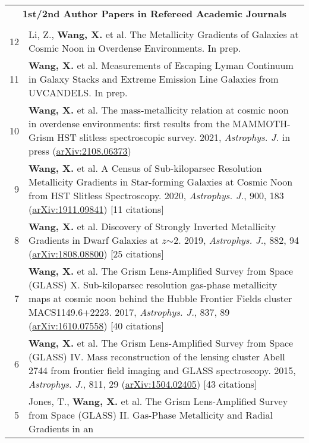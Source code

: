 \documentclass[letterpaper,12pt]{article}
\newcommand{\narrow}{-1.6ex}
\begin{document}
\vspace*{-.3in}

\begingroup
\renewcommand\arraystretch{1.2}
\begin{longtable}{rp{5.8in}}
\multicolumn{2}{c}{\textbf{1st/2nd Author Papers in Refereed Academic Journals}}      \\
\\[\narrow]

12 &  Li, Z., \textbf{Wang, X.} et al. The Metallicity Gradients of Galaxies at Cosmic Noon in Overdense Environments. In prep. \\
11 &  \textbf{Wang, X.} et al. Measurements of Escaping Lyman Continuum in Galaxy Stacks and Extreme Emission Line Galaxies from UVCANDELS. In prep. \\
10 &  \textbf{Wang, X.} et al. The mass-metallicity relation at cosmic noon in overdense environments: first results from the 
    MAMMOTH-Grism HST slitless spectroscopic survey. 2021, \textit{Astrophys. J.} in press 
    (\href{https://arxiv.org/abs/2108.06373}{arXiv:2108.06373})  \\
9 &  \textbf{Wang, X.} et al. A Census of Sub-kiloparsec Resolution Metallicity Gradients in Star-forming Galaxies at Cosmic Noon from HST Slitless 
    Spectroscopy. 2020, \textit{Astrophys. J.}, 900, 183 (\href{https://arxiv.org/abs/1911.09841}{arXiv:1911.09841}) [11 citations] \\
8 &  \textbf{Wang, X.} et al. Discovery of Strongly Inverted Metallicity Gradients in Dwarf Galaxies at $z$$\sim$2. 2019, \textit{Astrophys. J.}, 882, 
    94 (\href{https://arxiv.org/abs/1808.08800}{arXiv:1808.08800}) [25 citations]  \\
7 &  \textbf{Wang, X.} et al. The Grism Lens-Amplified Survey from Space (GLASS) X. Sub-kiloparsec resolution gas-phase metallicity maps at cosmic 
    noon behind the Hubble Frontier Fields cluster MACS1149.6+2223. 2017, \textit{Astrophys. J.}, 837, 89 (\href{http://arxiv.org/abs/1610.07558}
    {arXiv:1610.07558}) [40 citations]    \\
6 &  \textbf{Wang, X.} et al. The Grism Lens-Amplified Survey from Space (GLASS) IV. Mass reconstruction of the lensing cluster Abell 2744 from 
    frontier field imaging and GLASS spectroscopy. 2015, \textit{Astrophys. J.}, 811, 29 (\href{http://arxiv.org/abs/1504.02405}{arXiv:1504.02405}) 
    [43 citations] \\
5 &  Jones, T., \textbf{Wang, X.} et al. The Grism Lens-Amplified Survey from Space (GLASS) II. Gas-Phase Metallicity and Radial Gradients in an 
$$
\end{longtable}
\end{document}
